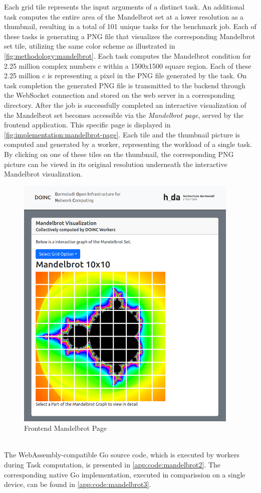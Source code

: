 Each grid tile represents the input arguments of a distinct task. An additional task computes the entire area of the Mandelbrot set at a lower resolution as a thumbnail, resulting in a total of 101 unique tasks for the benchmark job. Each of these tasks is generating a \acs{PNG} file that visualizes the corresponding Mandelbrot set tile, utilizing the same color scheme as illustrated in \autoref{fig:methodology:mandelbrot}. Each task computes the Mandelbrot condition for 2.25 million complex numbers $c$ within a 1500x1500 square region. Each of these 2.25 million $c$ is representing a pixel in the \acs{PNG} file generated by the task. On task completion the generated \acs{PNG} file is transmitted to the backend through the WebSocket connection and stored on the web server in a corresponding directory. After the job is successfully completed an interactive visualization of the Mandelbrot set becomes accessible via the \emph{Mandelbrot page}, served by the frontend application. This specific page is displayed in \autoref{fig:implementation:mandelbrot-page}. Each tile and the thumbnail picture is computed and generated by a worker, representing the workload of a single task. By clicking on one of these tiles on the thumbnail, the corresponding \acs{PNG} picture can be viewd in its original resolution underneath the interactive Mandelbrot visualization.
\begin{figure}[htbp]
    \centering
    \includegraphics[width=0.95\textwidth]{gfx/figures/mandelbrot-page.png}
    \caption{Frontend Mandelbrot Page}
    \label{fig:implementation:mandelbrot-page}
\end{figure}
~\\
The WebAssembly-compatible Go source code, which is executed by workers during Task computation, is presented in \autoref{app:code:mandelbrot2}. The corresponding native Go implementation, executed in comparission on a single device, can be found in \autoref{app:code:mandelbrot3}.

